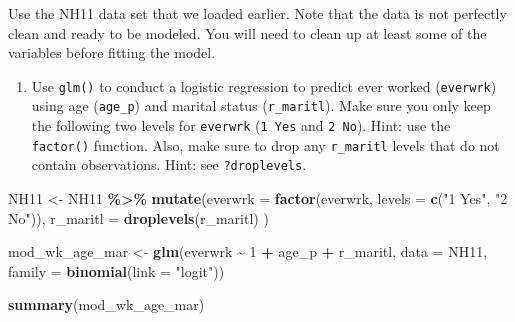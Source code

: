 \documentclass[
]{book}
\newenvironment{Shaded}{\begin{snugshade}}{\end{snugshade}}
\newcommand{\DataTypeTok}[1]{\textcolor[rgb]{0.13,0.29,0.53}{#1}}
\newcommand{\DecValTok}[1]{\textcolor[rgb]{0.00,0.00,0.81}{#1}}
\newcommand{\KeywordTok}[1]{\textcolor[rgb]{0.13,0.29,0.53}{\textbf{#1}}}
\newcommand{\NormalTok}[1]{#1}
\newcommand{\OperatorTok}[1]{\textcolor[rgb]{0.81,0.36,0.00}{\textbf{#1}}}
\newcommand{\StringTok}[1]{\textcolor[rgb]{0.31,0.60,0.02}{#1}}
\providecommand{\tightlist}{%
  \setlength{\itemsep}{0pt}\setlength{\parskip}{0pt}}
\begin{document}
\begin{alert}

Use the NH11 data set that we loaded earlier. Note that the data is not perfectly clean and ready to be modeled. You will need to clean up at least some of the variables before fitting the model.

\begin{enumerate}
\def\labelenumi{\arabic{enumi}.}
\tightlist
\item
  Use \texttt{glm()} to conduct a logistic regression to predict ever worked (\texttt{everwrk}) using age (\texttt{age\_p}) and marital status (\texttt{r\_maritl}). Make sure you only keep the following two levels for \texttt{everwrk} (\texttt{1\ Yes} and \texttt{2\ No}). Hint: use the \texttt{factor()} function. Also, make sure to drop any \texttt{r\_maritl} levels that do not contain observations. Hint: see \texttt{?droplevels}.
\end{enumerate}

\begin{Shaded}
\begin{Highlighting}[]
\NormalTok{  NH11 \textless{}{-}}\StringTok{ }
\StringTok{      }\NormalTok{NH11 }\OperatorTok{\%\textgreater{}\%}
\StringTok{      }\KeywordTok{mutate}\NormalTok{(}\DataTypeTok{everwrk =} \KeywordTok{factor}\NormalTok{(everwrk, }\DataTypeTok{levels =} \KeywordTok{c}\NormalTok{(}\StringTok{"1 Yes"}\NormalTok{, }\StringTok{"2 No"}\NormalTok{)),}
             \DataTypeTok{r\_maritl =} \KeywordTok{droplevels}\NormalTok{(r\_maritl)}
\NormalTok{             )}

\NormalTok{  mod\_wk\_age\_mar \textless{}{-}}\StringTok{ }\KeywordTok{glm}\NormalTok{(everwrk }\OperatorTok{\textasciitilde{}}\StringTok{ }\DecValTok{1} \OperatorTok{+}\StringTok{ }\NormalTok{age\_p }\OperatorTok{+}\StringTok{ }\NormalTok{r\_maritl, }
                        \DataTypeTok{data =}\NormalTok{ NH11,}
                        \DataTypeTok{family =} \KeywordTok{binomial}\NormalTok{(}\DataTypeTok{link =} \StringTok{"logit"}\NormalTok{))}

  \KeywordTok{summary}\NormalTok{(mod\_wk\_age\_mar)}
\end{Highlighting}
\end{Shaded}


\end{alert}
\end{document}
